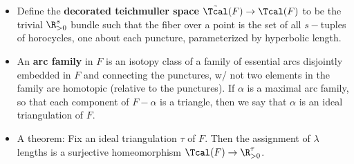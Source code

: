 \documentclass[11pt]{amsart}
\begin{document}
\begin{itemize}
  \item Define the \textbf{decorated teichmuller space} $\tilde{\Tcal}(F)\to \Tcal(F)$ to be the trivial $\R_{>0}^s$ bundle such that the fiber over a point is the set of all $s-$tuples of horocycles, one about each puncture, parameterized by hyperbolic length. 
  \item An  \textbf{arc family} in $F$ is an isotopy class of a family of essential arcs disjointly embedded in $F$ and connecting the punctures, w/ not two elements in the family are homotopic (relative to the punctures). If $\alpha$ is a maximal arc family, so that each component of $F-\alpha$ is a triangle, then we say that $\alpha$ is an ideal triangulation of $F$. 
  \item A theorem: Fix an ideal triangulation $\tau$ of $F$. Then the assignment of $\lambda$ lengths is a surjective homeomorphism $\Tcal(F) \to \R^\tau_{>0}$. 
\end{itemize}
\end{document}
